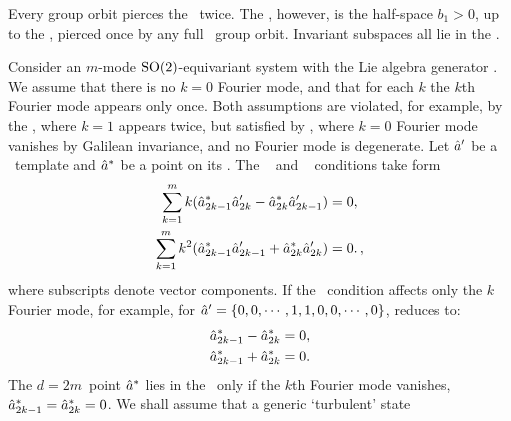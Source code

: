 Every group orbit pierces the \slicePlane\ twice. The \slice, however, is
the half-space $b_1 > 0$, up to the \chartBord, pierced  once by any full
\statesp\ group orbit. Invariant subspaces all lie in the \chartBord.

Consider an $m$-mode $\textrm{SO}(2)$-equivariant system with the Lie algebra
generator .
We assume that there is no $k=0$ Fourier mode,
and that for each $k$ the $k$th Fourier mode appears only once.
Both assumptions are violated, for example, by the \cLe, where $k=1$
appears twice, but satisfied by \KS,
where $k=0$ Fourier mode vanishes by Galilean invariance, and no
Fourier mode is degenerate.
Let $\hat{a}'$ be a \slice\ template and  $\hat{a}^{*}$ be a point on its
\chartBord. The \slice\  and \chartBord\
 conditions take form
\begin{subequations}\label{eq:mmodechartbord}
\begin{align}
	\sum_{k=1}^{m} k  (\hat{a}_{2k-1}^{*} \hat{a}'_{2k}
                       - \hat{a}_{2k}^{*} \hat{a}'_{2k-1})&= 0 ,
	\label{eq:mmodechartborda}
\\
	\sum_{k=1}^{m} k^2 (\hat{a}_{2k-1}^{*} \hat{a}'_{2k-1}
                       + \hat{a}_{2k}^{*} \hat{a}'_{2k}) &= 0
	\label{eq:mmodechartbordb} .
\,,
\end{align}
\end{subequations}
where subscripts denote vector components. If the \slice\ condition
affects only the $k$ Fourier mode, for example, for
$\hat{a}'=\{0,0,\cdots,1,1,0,0,\cdots,0\}$,  reduces to:
\begin{subequations}\label{eq:mmodechartbordred}
\begin{align}
	\hat{a}_{2k-1}^{*} - \hat{a}_{2k}^{*} &= 0 ,
	\label{eq:mmodechartbordreda}
\\
	\hat{a}_{2k-1}^{*} + \hat{a}_{2k}^{*} &= 0 .
	\label{eq:mmodechartbordredb}
\end{align}
\end{subequations}
The $d=2m$\dmn\ point $\hat{a}^{*}$ lies in the
\chartBord\ only if the $k$th Fourier mode vanishes,
$\hat{a}_{2k-1}^{*} = \hat{a}_{2k}^{*} = 0$. We shall
assume that a generic `turbulent' state
